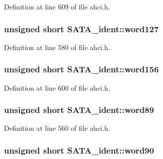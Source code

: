Definition at line 609 of file ahci.\+h.

\subsubsection[{\texorpdfstring{word127}{word127}}]{\setlength{\rightskip}{0pt plus 5cm}unsigned short S\+A\+T\+A\+\_\+ident\+::word127}\hypertarget{structSATA__ident_a0304f0c077add497b87185216200fca1}{}\label{structSATA__ident_a0304f0c077add497b87185216200fca1}


Definition at line 580 of file ahci.\+h.

\subsubsection[{\texorpdfstring{word156}{word156}}]{\setlength{\rightskip}{0pt plus 5cm}unsigned short S\+A\+T\+A\+\_\+ident\+::word156}\hypertarget{structSATA__ident_a56ba76f0701ac2544a8b69a54360915f}{}\label{structSATA__ident_a56ba76f0701ac2544a8b69a54360915f}


Definition at line 600 of file ahci.\+h.

\subsubsection[{\texorpdfstring{word89}{word89}}]{\setlength{\rightskip}{0pt plus 5cm}unsigned short S\+A\+T\+A\+\_\+ident\+::word89}\hypertarget{structSATA__ident_ac3c1a0f34c6c77762de11b4a1995914a}{}\label{structSATA__ident_ac3c1a0f34c6c77762de11b4a1995914a}


Definition at line 560 of file ahci.\+h.

\subsubsection[{\texorpdfstring{word90}{word90}}]{\setlength{\rightskip}{0pt plus 5cm}unsigned short S\+A\+T\+A\+\_\+ident\+::word90}\hypertarget{structSATA__ident_a2c2baf9509a80f36e4e1ac4767937005}{}\label{structSATA__ident_a2c2baf9509a80f36e4e1ac4767937005}


